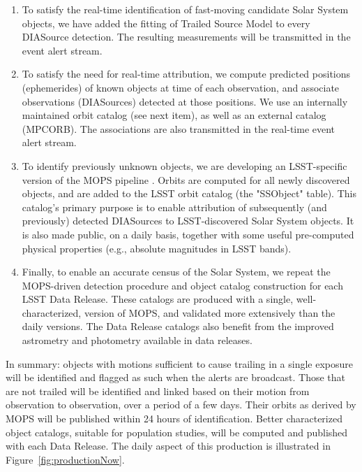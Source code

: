 \documentclass[DM,authoryear,toc,lsstdraft]{lsstdoc}
\begin{document}
\begin{enumerate}
	\item To satisfy the real-time identification of fast-moving candidate Solar System objects, we have added the fitting of Trailed Source Model to every DIASource detection. The resulting measurements will be transmitted in the event alert stream.
	\item To satisfy the need for real-time attribution, we compute predicted positions (ephemerides) of known objects at time of each observation, and associate observations (DIASources) detected at those positions. We use an internally maintained orbit catalog (see next item), as well as an external catalog (MPCORB). The associations are also transmitted in the real-time event alert stream.
	\item To identify previously unknown objects, we are developing an LSST-specific version of the MOPS pipeline . Orbits are computed for all newly discovered objects, and are added to the LSST orbit catalog (the "SSObject" table). This catalog's primary purpose is to enable attribution of subsequently (and previously) detected DIASources to LSST-discovered Solar System objects. It is also made public, on a daily basis, together with some useful pre-computed physical properties (e.g., absolute magnitudes in LSST bands).
	\item Finally, to enable an accurate census of the Solar System, we repeat the MOPS-driven detection procedure and object catalog construction for each LSST Data Release. These catalogs are produced with a single, well-characterized, version of MOPS, and validated more extensively than the daily versions. The Data Release catalogs also benefit from the improved astrometry and photometry available in data releases.
\end{enumerate}

In summary: objects with motions sufficient to cause trailing in a single exposure will
be identified and flagged as such when the alerts are broadcast. Those that are not trailed will be identified and linked based on their motion from observation to observation, over a period of a few days. Their orbits as derived by MOPS will be published within 24 hours of identification. Better characterized object catalogs, suitable for population studies, will be computed and published with each Data Release. The daily aspect of this production is illustrated in Figure~\ref{fig:productionNow}.
\end{document}
